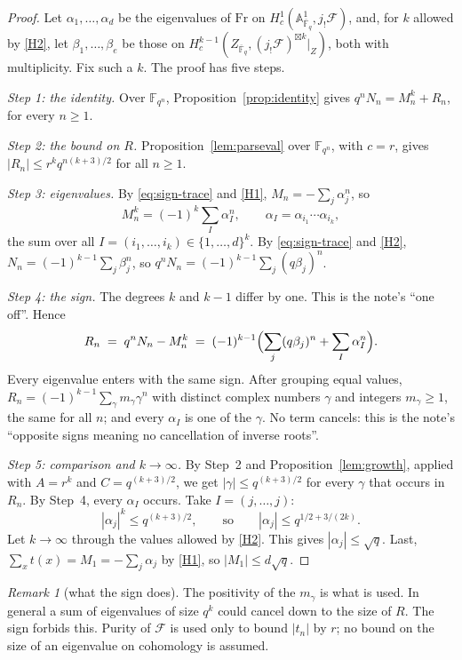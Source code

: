 \documentclass[11pt]{amsbook}
\theoremstyle{plain}
\theoremstyle{definition}
\theoremstyle{remark}
\newtheorem{remark}[theorem]{Remark}
\numberwithin{equation}{section}
\numberwithin{figure}{chapter}
\numberwithin{table}{chapter}
\newcommand{\F}{\mathbb{F}}
\newcommand{\Fr}{\mathrm{Fr}}
\newcommand{\Fb}{\overline{\F}_q}
\newcommand{\cF}{\mathcal{F}}
\begin{document}
\begin{proof}
Let $\alpha_1, \dots, \alpha_d$ be the eigenvalues of $\Fr$ on
$H^1_c(\mathbb{A}^1_{\Fb},j_!\cF)$, and, for $k$ allowed by \ref{H2},
let $\beta_1, \dots, \beta_e$ be those on
$H^{k-1}_c(Z_{\Fb}, (j_!\cF)^{\boxtimes k}|_Z)$, both with
multiplicity. Fix such a $k$. The proof has five steps.

\emph{Step 1: the identity.} Over $\F_{q^n}$,
Proposition~\ref{prop:identity} gives $q^nN_n = M_n^k + R_n$, for
every $n\ge1$.

\emph{Step 2: the bound on $R$.}
Proposition~\ref{lem:parseval} over $\F_{q^n}$, with $c = r$, gives
$|R_n| \le r^k q^{n(k+3)/2}$ for all $n \ge 1$.

\emph{Step 3: eigenvalues.} By \eqref{eq:sign-trace} and \ref{H1},
$M_n = -\sum_j \alpha_j^n$, so
\[
  M_n^k = (-1)^k \sum_{I} \alpha_I^n,\qquad
  \alpha_I = \alpha_{i_1}\cdots\alpha_{i_k},
\]
the sum over all $I = (i_1,\dots,i_k) \in \{1,\dots,d\}^k$. By
\eqref{eq:sign-trace} and \ref{H2},
$N_n = (-1)^{k-1}\sum_j \beta_j^n$, so
$q^nN_n = (-1)^{k-1}\sum_j (q\beta_j)^n$.

\emph{Step 4: the sign.} The degrees $k$ and $k-1$ differ by one.
This is the note's ``one off''. Hence
\[
  R_n \;=\; q^nN_n - M_n^k
  \;=\; (-1)^{k-1}\Bigl(\sum_j (q\beta_j)^n
  + \sum_I \alpha_I^n\Bigr).
\]
Every eigenvalue enters with the same sign. After grouping equal
values, $R_n = (-1)^{k-1}\sum_\gamma m_\gamma \gamma^n$ with
distinct complex numbers $\gamma$ and integers $m_\gamma \ge 1$,
the same for all $n$; and every $\alpha_I$ is one of the $\gamma$.
No term cancels: this is the note's ``opposite signs meaning no
cancellation of inverse roots''.

\emph{Step 5: comparison and $k \to \infty$.} By Step~2 and
Proposition~\ref{lem:growth}, applied with $A=r^k$ and
$C=q^{(k+3)/2}$, we get $|\gamma| \le q^{(k+3)/2}$ for every
$\gamma$ that occurs in $R_n$. By Step~4, every $\alpha_I$ occurs.
Take $I = (j, \dots, j)$:
\[
  |\alpha_j|^k \le q^{(k+3)/2},\qquad\text{so}\qquad
  |\alpha_j| \le q^{1/2 + 3/(2k)} .
\]
Let $k \to \infty$ through the values allowed by \ref{H2}. This
gives $|\alpha_j| \le \sqrt q$. Last,
$\sum_x t(x) = M_1 = -\sum_j \alpha_j$ by \ref{H1}, so
$|M_1| \le d\sqrt q$.
\end{proof}

\begin{remark}[what the sign does]\label{rem:sign-positivity}
The positivity of the $m_\gamma$ is what is used. In general a sum
of eigenvalues of size $q^{k}$ could cancel down to the size of
$R$. The sign forbids this. Purity of $\cF$ is used only to bound
$|t_n|$ by $r$; no bound on the size of an eigenvalue on cohomology
is assumed.
\end{remark}
\end{document}
